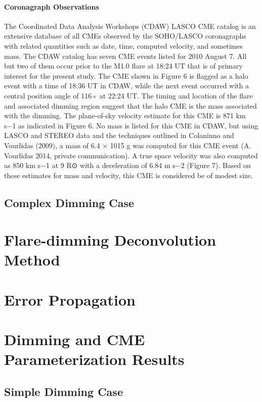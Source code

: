 \paragraph{Coronagraph Observations}
The Coordinated Data Analysis Workshops (CDAW) LASCO CME catalog is an extensive database of all CMEs observed by the SOHO/LASCO coronagraphs with related quantities such as date, time, computed velocity, and sometimes mass.
The CDAW catalog has seven CME events listed for 2010 August 7. All but two of them occur prior to the M1.0 flare at 18:24 UT that is of primary interest for the present study. The CME shown in Figure 6 is flagged as a halo event with a time of 18:36 UT in CDAW, while the next event occurred with a central position angle of 116◦ at 22:24 UT. The timing and location of the flare and associated dimming region suggest that the halo CME is the mass associated with the dimming. The plane-of-sky velocity estimate for this CME is 871 km s−1 as indicated in Figure 6. No mass is listed for this CME in CDAW, but using LASCO and STEREO data and the techniques outlined in Colaninno and Vourlidas (2009), a mass of 6.4 × 1015 g was computed for this CME event (A. Vourlidas 2014, private communication). A true space velocity was also computed as 850 km s−1 at 9 R⊙ with a deceleration of 6.84 m s−2 (Figure 7). Based on these estimates for mass and velocity, this CME is
considered be of modest size.

\subsection{Complex Dimming Case}

\section{Flare-dimming Deconvolution Method}
\label{sec:deconvolve}

\section{Error Propagation}
\label{sec:deconvolveerrors}

\section{Dimming and CME Parameterization Results}
\label{sec:casestudyresults}

\subsection{Simple Dimming Case}

